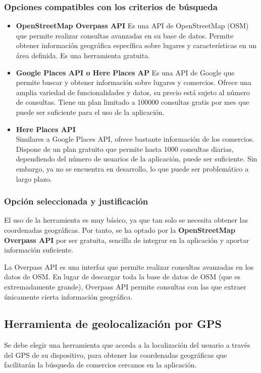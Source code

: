 \subsubsection{Opciones compatibles con los criterios de búsqueda}
\begin{itemize}
    \item \textbf{OpenStreetMap Overpass API}
    Es una API de OpenStreetMap (OSM) que permite realizar consultas avanzadas en su base de datos. Permite obtener información geográfica específica sobre lugares y características en un área definida. Es una herramienta gratuita.
    \item \textbf{Google Places API o Here Places AP}
    Es una API de Google que permite buscar y obtener información sobre lugares y comercios. Ofrece una amplia variedad de funcionalidades y datos, su precio está sujeto al número de consultas. Tiene un plan limitado a 100000 consultas gratis por mes que puede ser suficiente para el uso de la aplicación\cite{google_places_api}.
    \item \textbf{Here Places API}\\
    Similares a Google Places API, ofrece bastante información de los comercios. Dispone de un plan gratuito que permite hasta 1000 consultas diarias, dependiendo del número de usuarios de la aplicación, puede ser suficiente. Sin embargo, ya no se encuentra en desarrollo, lo que puede ser problemático a largo plazo\cite{here_places_api}.
\end{itemize}

\subsubsection{Opción seleccionada y justificación}
El uso de la herramienta es muy básico, ya que tan solo se necesita obtener las coordenadas geográficas. Por tanto, se ha optado por la \textbf{OpenStreetMap Overpass API} por ser gratuita, sencilla de integrar en la aplicación y aportar información suficiente.

La Overpass API es una interfaz que permite realizar consultas avanzadas en los datos de OSM. En lugar de descargar toda la base de datos de OSM (que es extremadamente grande), Overpass API permite consultas con las que extraer únicamente cierta información geográfica\cite{overpassAPI2023}.


\subsection{Herramienta de geolocalización por GPS}
Se debe elegir una herramienta que acceda a la localización del usuario a través del GPS de su dispositivo, para obtener las coordenadas geográficas que facilitarán la búsqueda de comercios cercanos en la aplicación. 

